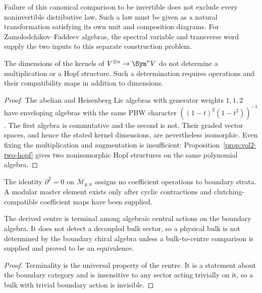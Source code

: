 Failure of this canonical comparison to be invertible does not exclude
every noninvertible distributive law. Such a law must be given as a
natural transformation satisfying its own unit and composition diagrams.
For Zamolodchikov--Faddeev algebras, the spectral variable and transverse
word supply the two inputs to this separate construction problem.

\begin{theorem}
\label{nogo:dimension-loss-spine}
The dimensions of the kernels of $V^{\otimes n}\to\Sym^nV$ do not
determine a multiplication or a Hopf structure. Such a determination
requires operations and their compatibility maps in addition to dimensions.
\end{theorem}
\begin{proof}
The abelian and Heisenberg Lie algebras with generator weights $1,1,2$
have enveloping algebras with the same PBW character
$((1-t)^2(1-t^2))^{-1}$.
The first algebra is commutative and the second is not.
Their graded vector spaces, and hence the stated kernel dimensions,
are nevertheless isomorphic.
Even fixing the multiplication and augmentation is insufficient:
Proposition~\ref{prop:vol2-two-hopf} gives two nonisomorphic Hopf
structures on the same polynomial algebra.
\end{proof}

\begin{theorem}
The identity $\partial^2=0$ on $\overline{\mathcal M}_{g,n}$ assigns no
coefficient operations to boundary strata. A modular master element exists only
after cyclic contractions and clutching-compatible coefficient maps have been
supplied.
\end{theorem}

\begin{theorem}
The derived centre is terminal among algebraic central actions on the boundary
algebra. It does not detect a decoupled bulk sector, so a physical bulk is not
determined by the boundary chiral algebra unless a bulk-to-centre comparison is
supplied and proved to be an equivalence.
\end{theorem}
\begin{proof}
Terminality is the universal property of the centre. It is a statement about
the boundary category and is insensitive to any sector acting trivially on it,
so a bulk with trivial boundary action is invisible.
\end{proof}

